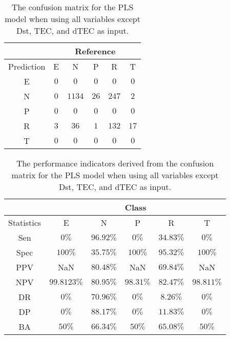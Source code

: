 \begin{table}[!ht]
	\centering
	\begin{tabular}{|c|c|c|c|c|c|}
		\hline
		 & \multicolumn{5}{|c|}{Reference} \\ \hline
		 Prediction & E & N & P & R & T \\ \hline
		 E & $0$ & $0$ & $0$ & $0$ & $0$ \\ \hline
		 N & $0$ & $1134$ & $26$ & $247$ & $2$ \\ \hline
		 P & $0$ & $0$ & $0$ & $0$ & $0$ \\ \hline
		 R & $3$ & $36$ & $1$ & $132$ & $17$ \\ \hline
		 T & $0$ & $0$ & $0$ & $0$ & $0$ \\ \hline
	\end{tabular}
	\caption{The confusion matrix for the PLS model when using all variables except Dst, TEC, and dTEC as input.}
	\label{tab:cm:noTEC:pls}
\end{table}

\begin{table}[!ht]
	\centering
	\begin{tabular}{|c|c|c|c|c|c|}
		\hline
		 & \multicolumn{5}{c|}{Class} \\ \hline
		Statistics & E & N & P & R & T \\ \hline
		Sen & $0\%$ & $96.92\%$ & $0\%$ & $34.83\%$ & $0\%$ \\ \hline
		Spec & $100\%$ & $35.75\%$ & $100\%$ & $95.32\%$ & $100\%$ \\ \hline
		PPV & NaN & $80.48\%$ & NaN & $69.84\%$ & NaN \\ \hline
		NPV & $99.8123\%$ & $80.95\%$ & $98.31\%$ & $82.47\%$ & $98.811\%$ \\ \hline
		DR & $0\%$ & $70.96\%$ & $0\%$ & $8.26\%$ & $0\%$ \\ \hline
		DP & $0\%$ & $88.17\%$ & $0\%$ & $11.83\%$ & $0\%$ \\ \hline
		BA & $50\%$ & $66.34\%$ & $50\%$ & $65.08\%$ & $50\%$ \\ \hline
	\end{tabular}
	\caption{The performance indicators derived from the confusion matrix for the PLS model when using all variables except Dst, TEC, and dTEC as input.}
	\label{tab:cs:reverse:noTEC:pls}
\end{table}
